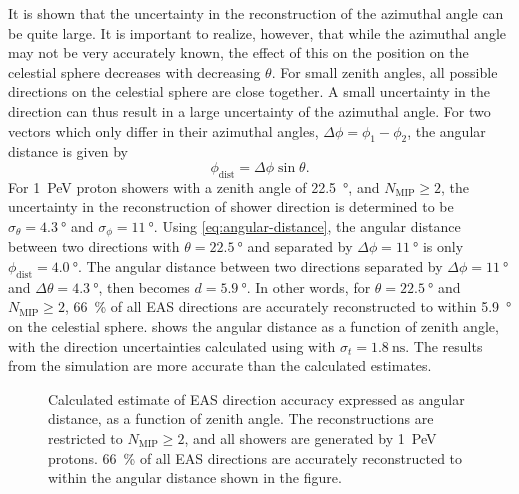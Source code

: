 It is shown that the uncertainty in the reconstruction of the azimuthal angle
can be quite large.  It is important to realize, however, that while the
azimuthal angle may not be very accurately known, the effect of this on the
position on the celestial sphere decreases with decreasing $\theta$.  For small
zenith angles, all possible directions on the celestial sphere are close
together.
A small uncertainty in the direction can thus result in a large uncertainty of
the azimuthal angle. For two vectors which only differ in their azimuthal
angles, $\Delta\phi = \phi_1 - \phi_2$, the angular distance is given by
\begin{equation}
\phi_\mathrm{dist} = \Delta\phi \sin\theta.
\label{eq:angular-distance}
\end{equation}
For \SI{1}{\peta\electronvolt} proton showers with a zenith angle of
\SI{22.5}{\degree}, and $N_\mathrm{MIP} \geq 2$, the uncertainty in the
reconstruction of shower direction is determined to be $\sigma_\theta =
\SI{4.3}{\degree}$ and $\sigma_\phi = \SI{11}{\degree}$.
Using \eqref{eq:angular-distance}, the angular distance between two directions
with $\theta = \SI{22.5}{\degree}$ and separated by $\Delta\phi =
\SI{11}{\degree}$ is only $\phi_\mathrm{dist} = \SI{4.0}{\degree}$. The angular
distance between two directions separated by
$\Delta\phi = \SI{11}{\degree}$ and $\Delta\theta = \SI{4.3}{\degree}$, then
becomes $d = \SI{5.9}{\degree}$. In other words, for $\theta =
\SI{22.5}{\degree}$ and $N_\mathrm{MIP} \geq 2$, \SI{66}{\percent} of all EAS
directions are accurately reconstructed to within \SI{5.9}{\degree} on the
celestial sphere.  shows the angular distance
as a function of zenith angle, with the direction uncertainties calculated using
 with $\sigma_t = \SI{1.8}{\nano\second}$. The
results from the simulation are more accurate than the calculated
estimates.
\begin{figure}
\centering

\caption{Calculated estimate of EAS direction accuracy expressed as
angular distance, as a function of zenith angle. The reconstructions are
restricted to $N_\mathrm{MIP} \geq 2$, and all showers are generated by
\SI{1}{\peta\electronvolt} protons. \SI{66}{\percent} of all EAS
directions are accurately reconstructed to within the angular distance
shown in the figure.}
\label{fig:sim-angular-distance}
\end{figure}

